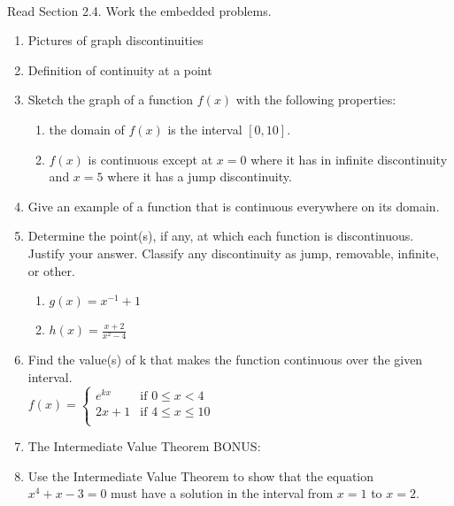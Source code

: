 \documentclass[11pt,fleqn]{article}
\begin{document}
\renewcommand{\headrulewidth}{0pt}
\newcommand{\blank}[1]{\rule{#1}{0.75pt}}
\newcommand{\bc}{\begin{center}}
\newcommand{\ec}{\end{center}}
\renewcommand{\d}{\displaystyle}

\vspace*{-0.7in}

\begin{center}
  \large
  \\
\end{center}
Read Section 2.4. Work the embedded problems. \\
\hrulefill

\begin{enumerate}
\item Pictures of graph discontinuities
\vfill
\item Definition of continuity at a point
\vfill
\item Sketch the graph of a function $f(x)$ with the following properties:\\
\begin{enumerate}
\item the domain of $f(x)$ is the interval $[0,10].$
\item $f(x)$ is continuous except at $x=0$ where it has in infinite discontinuity and $x=5$ where it has a jump discontinuity.
\end{enumerate}
\vfill
\item Give an example of a function that is continuous everywhere on its domain.
\vspace{.5in}

\newpage
\item Determine the point(s), if any, at which each function is discontinuous. Justify your answer. Classify any discontinuity as jump, removable, infinite, or other.
\begin{enumerate}
	\item $g(x) = x^{-1}+1$
	\vfill
	\item $h(x)=\frac{x+2}{x^2-4}$
	\vfill
		\end{enumerate}
\item Find the value(s) of k that makes the function continuous over the given interval.\\
$f(x)=\begin{cases} e^{kx} & \text{if } 0 \leq x < 4 \\
				2x+1 & \text{if } 4 \leq x \leq 10 \\
				\end{cases}$
\vspace{2in}
\newpage
\item The Intermediate Value Theorem
\vfill
BONUS:
\item Use the Intermediate Value Theorem to show that the equation $x^4+x-3=0$ must have a solution in
the interval from $x=1$ to $x=2.$
\vfill

\end{enumerate}
\end{document}

